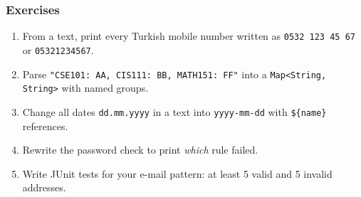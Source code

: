 \documentclass[aspectratio=169,10pt,compress]{beamer}
\begin{document}
\begin{frame}[t,fragile] \frametitle{Exercises}
  \begin{enumerate}\small
    \item From a text, print every Turkish mobile number written as \texttt{0532 123 45 67} or \texttt{05321234567}.
    \item Parse \texttt{"CSE101: AA, CIS111: BB, MATH151: FF"} into a \texttt{Map<String, String>} with named groups.
    \item Change all dates \texttt{dd.mm.yyyy} in a text into \texttt{yyyy-mm-dd} with \texttt{\$\{name\}} references.
    \item Rewrite the password check to print \emph{which} rule failed.
    \item Write JUnit tests for your e-mail pattern: at least 5 valid and 5 invalid addresses.
  \end{enumerate}
\end{frame}




\begin{frame}[t,fragile]
	\begin{center}
		\vspace{4cm}
	\end{center}
\end{frame}
\end{document}
